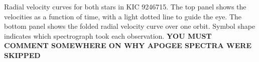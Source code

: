 \label{fig:rvfig} Radial velocity curves for both stars in KIC 9246715. The top panel shows the velocities as a function of time, with a light dotted line to guide the eye. The bottom panel shows the folded radial velocity curve over one orbit. Symbol shape indicates which spectrograph took each observation. {\bf{YOU MUST COMMENT SOMEWHERE ON WHY APOGEE SPECTRA WERE SKIPPED}}
  